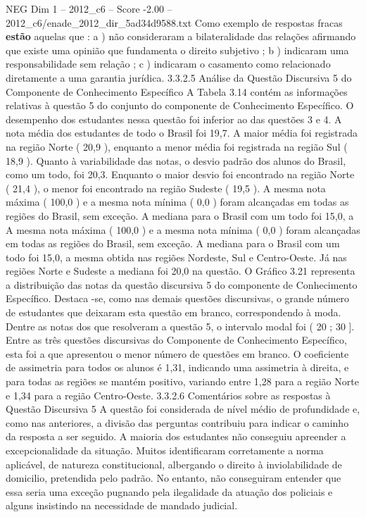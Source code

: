 \begin{textsample}{NEG Dim 1 – 2012\_c6 – Score -2.00 – 2012\_c6/enade\_2012\_dir\_5ad34d9588.txt}
Como exemplo de respostas fracas \textbf{estão} aquelas que : a ) não consideraram a bilateralidade das relações afirmando que existe uma opinião que fundamenta o direito subjetivo ; b ) indicaram uma responsabilidade sem relação ; c ) indicaram o casamento como relacionado diretamente a uma garantia jurídica. 3.3.2.5 Análise da Questão Discursiva 5 do Componente de Conhecimento Específico A Tabela 3.14 contém as informações relativas à questão 5 do conjunto do componente de Conhecimento Específico.
O desempenho dos estudantes nessa questão foi inferior ao das questões 3 e 4.
A nota média dos estudantes de todo o Brasil foi 19,7.
A maior média foi registrada na região Norte ( 20,9 ), enquanto a menor média foi registrada na região Sul ( 18,9 ).
Quanto à variabilidade das notas, o desvio padrão dos alunos do Brasil, como um todo, foi 20,3.
Enquanto o maior desvio foi encontrado na região Norte ( 21,4 ), o menor foi encontrado na região Sudeste ( 19,5 ).
A mesma nota máxima ( 100,0 ) e a mesma nota mínima ( 0,0 ) foram alcançadas em todas as regiões do Brasil, sem exceção.
A mediana para o Brasil com um todo foi 15,0, a A mesma nota máxima ( 100,0 ) e a mesma nota mínima ( 0,0 ) foram alcançadas em todas as regiões do Brasil, sem exceção.
A mediana para o Brasil com um todo foi 15,0, a mesma obtida nas regiões Nordeste, Sul e Centro-Oeste.
Já nas regiões Norte e Sudeste a mediana foi 20,0 na questão.
O Gráfico 3.21 representa a distribuição das notas da questão discursiva 5 do componente de Conhecimento Específico.
Destaca -se, como nas demais questões discursivas, o grande número de estudantes que deixaram esta questão em branco, correspondendo à moda.
Dentre as notas dos que resolveram a questão 5, o intervalo modal foi ( 20 ; 30 ].
Entre as três questões discursivas do Componente de Conhecimento Específico, esta foi a que apresentou o menor número de questões em branco.
O coeficiente de assimetria para todos os alunos é 1,31, indicando uma assimetria à direita, e para todas as regiões se mantém positivo, variando entre 1,28 para a região Norte e 1,34 para a região Centro-Oeste. 3.3.2.6 Comentários sobre as respostas à Questão Discursiva 5 A questão foi considerada de nível médio de profundidade e, como nas anteriores, a divisão das perguntas contribuiu para indicar o caminho da resposta a ser seguido.
A maioria dos estudantes não conseguiu apreender a excepcionalidade da situação.
Muitos identificaram corretamente a norma aplicável, de natureza constitucional, albergando o direito à inviolabilidade de domicilio, pretendida pelo padrão.
No entanto, não conseguiram entender que essa seria uma exceção pugnando pela ilegalidade da atuação dos policiais e alguns insistindo na necessidade de mandado judicial.

\end{textsample}
